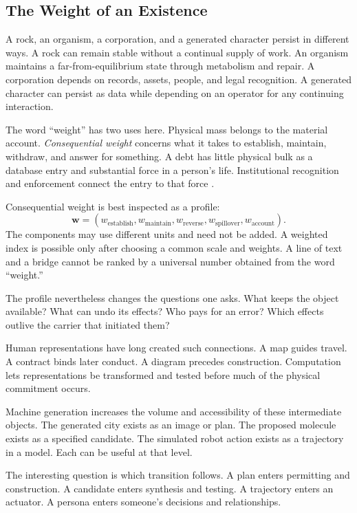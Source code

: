 \documentclass[11pt,openany]{book}
\begin{document}
\subsection{The Weight of an Existence}

A rock, an organism, a corporation, and a generated character persist in different ways. A rock can remain stable without a continual supply of work. An organism maintains a far-from-equilibrium state through metabolism and repair. A corporation depends on records, assets, people, and legal recognition. A generated character can persist as data while depending on an operator for any continuing interaction.

The word “weight” has two uses here. Physical mass belongs to the material account. \emph{Consequential weight} concerns what it takes to establish, maintain, withdraw, and answer for something. A debt has little physical bulk as a database entry and substantial force in a person's life. Institutional recognition and enforcement connect the entry to that force \cite{searle1995construction}.

Consequential weight is best inspected as a profile:
\begin{equation}
 \mathbf w=
 (w_{\mathrm{establish}},w_{\mathrm{maintain}},
  w_{\mathrm{reverse}},w_{\mathrm{spillover}},
  w_{\mathrm{account}}).
\end{equation}
The components may use different units and need not be added. A weighted index is possible only after choosing a common scale and weights. A line of text and a bridge cannot be ranked by a universal number obtained from the word “weight.”

The profile nevertheless changes the questions one asks. What keeps the object available? What can undo its effects? Who pays for an error? Which effects outlive the carrier that initiated them?

Human representations have long created such connections. A map guides travel. A contract binds later conduct. A diagram precedes construction. Computation lets representations be transformed and tested before much of the physical commitment occurs.

Machine generation increases the volume and accessibility of these intermediate objects. The generated city exists as an image or plan. The proposed molecule exists as a specified candidate. The simulated robot action exists as a trajectory in a model. Each can be useful at that level.

The interesting question is which transition follows. A plan enters permitting and construction. A candidate enters synthesis and testing. A trajectory enters an actuator. A persona enters someone's decisions and relationships.
\end{document}
